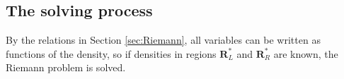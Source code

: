 \documentclass[review]{elsarticle}
\begin{document}
%
%
%
%

  \subsection{The solving process}\label{sec:iteration}
  By the relations in Section  \ref{sec:Riemann}, all  variables can be written as functions of  the density, so if  densities in regions $\mathbf{R}^*_L$ and  $\mathbf{R}^*_R$ are known, the Riemann problem is solved. 
\end{document}
